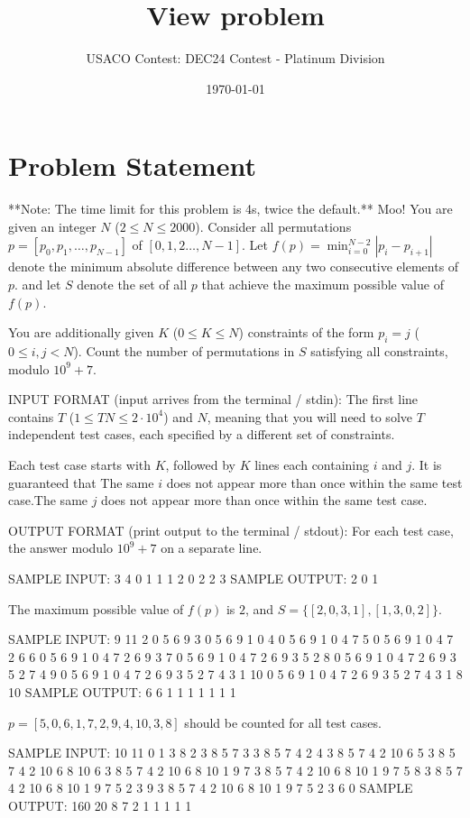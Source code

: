 \documentclass[12pt]{article}
\title{View problem}
\author{USACO Contest: DEC24 Contest - Platinum Division}
\date{\today}
\begin{document}
\maketitle

\section*{Problem Statement}


**Note: The time limit for this problem is 4s, twice the default.**
Moo! You are given an integer $N$ ($2\le N\le 2000$). Consider all permutations
$p=[p_0,p_1,\dots, p_{N-1}]$ of $[0,1,2\dots, N-1]$.  Let
$f(p)=\min_{i=0}^{N-2}|p_i-p_{i+1}|$ denote the minimum absolute difference
between any two consecutive elements of $p$. and let $S$ denote the set of all
$p$ that achieve the maximum possible value of $f(p)$.

You are additionally given $K$ ($0\le K\le N$) constraints of the form $p_i=j$
($0\le i,j<N$). Count the number of permutations in $S$ satisfying all
constraints, modulo $10^9+7$.

INPUT FORMAT (input arrives from the terminal / stdin):
The first line contains $T$ ($1\le TN\le 2\cdot 10^4$) and $N$, meaning that you
will need to solve $T$ independent test cases, each specified by a different set
of constraints.

Each test case starts with $K$, followed by $K$ lines each containing $i$ and
$j$. It is guaranteed that 
The same $i$ does not appear more than once within the same test case.The same $j$ does not appear more than once within the same test case.

OUTPUT FORMAT (print output to the terminal / stdout):
For each test case, the answer modulo $10^9+7$ on a separate line.

SAMPLE INPUT:
3 4
0
1
1 1
2
0 2
2 3
SAMPLE OUTPUT: 
2
0
1

The maximum possible value of $f(p)$ is $2$, and $S=\{[2,0,3,1], [1,3,0,2]\}$.

SAMPLE INPUT:
9 11
2
0 5
6 9
3
0 5
6 9
1 0
4
0 5
6 9
1 0
4 7
5
0 5
6 9
1 0
4 7
2 6
6
0 5
6 9
1 0
4 7
2 6
9 3
7
0 5
6 9
1 0
4 7
2 6
9 3
5 2
8
0 5
6 9
1 0
4 7
2 6
9 3
5 2
7 4
9
0 5
6 9
1 0
4 7
2 6
9 3
5 2
7 4
3 1
10
0 5
6 9
1 0
4 7
2 6
9 3
5 2
7 4
3 1
8 10
SAMPLE OUTPUT: 
6
6
1
1
1
1
1
1
1

$p=[5, 0, 6, 1, 7, 2, 9, 4, 10, 3, 8]$ should be counted for all test cases.

SAMPLE INPUT:
10 11
0
1
3 8
2
3 8
5 7
3
3 8
5 7
4 2
4
3 8
5 7
4 2
10 6
5
3 8
5 7
4 2
10 6
8 10
6
3 8
5 7
4 2
10 6
8 10
1 9
7
3 8
5 7
4 2
10 6
8 10
1 9
7 5
8
3 8
5 7
4 2
10 6
8 10
1 9
7 5
2 3
9
3 8
5 7
4 2
10 6
8 10
1 9
7 5
2 3
6 0
SAMPLE OUTPUT: 
160
20
8
7
2
1
1
1
1
1
\end{document}
